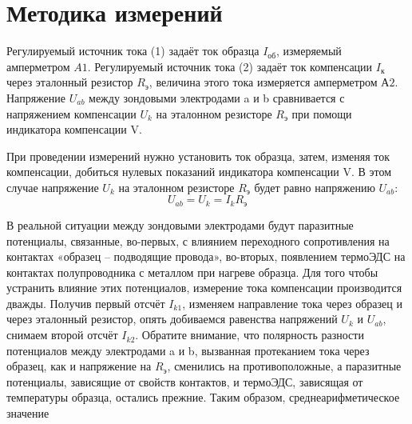 \section{Методика измерений}


Регулируемый источник тока (1) задаёт ток образца $I_\text{об}$, измеряемый амперметром $A1$. Регулируемый источник тока
(2) задаёт ток компенсации $I_\text{к}$ через эталонный резистор $R_\text{э}$, величина этого тока измеряется
амперметром $А2$. Напряжение $U_{ab}$ между зондовыми электродами a и b сравнивается с напряжением компенсации $U_k$ на
эталонном резисторе $R_\text{э}$ при помощи индикатора компенсации V.

При проведении измерений нужно установить ток образца, затем, изменяя ток компенсации, добиться нулевых показаний
индикатора компенсации V. В этом случае напряжение $U_k$ на эталонном резисторе $R_\text{э}$ будет равно напряжению $U_{ab}$:
\begin{equation}
	U_{ab}=U_{k}=I_{k} R_{\text{э}} 
	\label{eq:5.1}
\end{equation}

В реальной ситуации между зондовыми электродами будут паразитные потенциалы, связанные, во-первых, с влиянием
переходного сопротивления на контактах «образец – подводящие провода», во-вторых, появлением термоЭДС на контактах
полупроводника с металлом при нагреве образца. Для того чтобы устранить влияние этих потенциалов, измерение тока
компенсации производится дважды. Получив первый отсчёт $I_{k1}$, изменяем направление тока через образец и через
эталонный резистор, опять добиваемся равенства напряжений $U_k$ и $U_{ab}$, снимаем второй отсчёт $I_{k2}$. Обратите
внимание, что полярность разности потенциалов между электродами a и b, вызванная протеканием тока через образец, как и
напряжение на $R_\text{э}$, сменились на противоположные, а паразитные потенциалы, зависящие от свойств контактов, и
термоЭДС, зависящая от температуры образца, остались прежние. Таким образом, среднеарифметическое значение 

